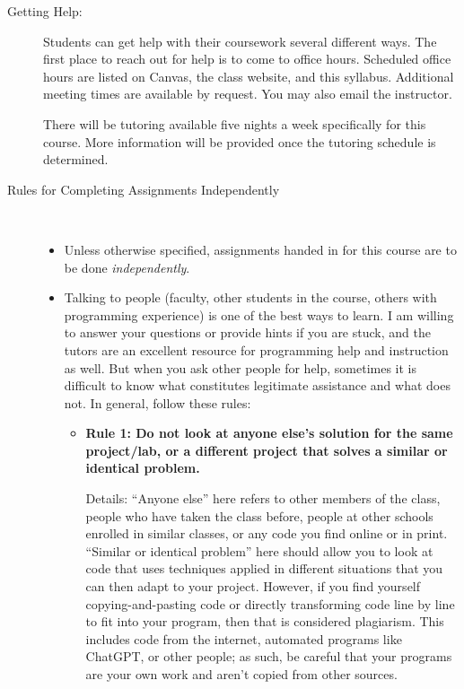 \documentclass [letterpaper,11pt]{article}
\begin{document}
\begin{description}
\item[Getting Help:]
Students can get help with their coursework several different ways. The first place to
reach out for help is to come to office hours. Scheduled office hours are listed on Canvas, the class website, and this syllabus.
Additional meeting times are available by request. You may also email the instructor.

There will be tutoring available five nights a week specifically for this course. More information will be provided
once the tutoring schedule is determined.

\item[Rules for Completing Assignments Independently]\
\begin{itemize}
        \item Unless otherwise specified, assignments handed in for this course are to be done \emph{independently}.  
        \item Talking to people (faculty, other students in the course, others with programming experience) is one of the best ways to learn.  I am willing to answer your questions or provide hints if you are stuck, and the tutors are an excellent resource for programming help and instruction as well.  But when you ask other people for help, sometimes
        it is difficult to know what constitutes legitimate assistance and what does not.  In general, follow these rules:
        
        \begin{itemize}
                \item \textbf{Rule 1: Do not look at anyone else's solution for the same project/lab, or a different project that solves a similar 
                or identical problem.}
                
                Details: ``Anyone else'' here refers to other members of the class, people who have taken the class before, people at other
                schools enrolled in similar classes, or any code you find online or in print.  ``Similar or identical problem'' here should 
                allow you to look at code that uses techniques applied in different situations that you can then 
                adapt to your project.  However, if you find yourself copying-and-pasting code or directly transforming
                code line by line to fit into your program, then that is considered plagiarism. This includes code from the internet, automated programs like ChatGPT, or other people; as such, be careful that your programs are your own work and aren't copied from other sources.\newline
                

\end{itemize}
\end{itemize}
\end{description}
\end{document}
